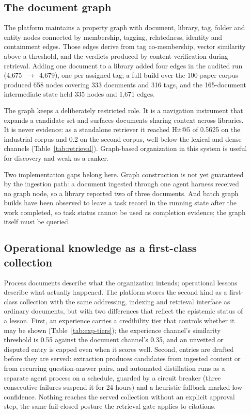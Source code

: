 \subsection{The document graph}
\label{sec:org-graph}

The platform maintains a property graph with document, library, tag, folder
and entity nodes connected by membership, tagging, relatedness, identity and
containment edges. Those edges derive from tag co-membership, vector
similarity above a threshold, and the verdicts produced by content
verification during retrieval. Adding one document to a library added four
edges in the audited run (4{,}675~$\rightarrow$~4{,}679), one per assigned
tag; a full build over the 100-paper corpus produced 658 nodes covering 333
documents and 316 tags, and the 165-document intermediate state held 335
nodes and 1{,}671 edges.

The graph keeps a deliberately restricted role. It is a navigation instrument
that expands a candidate set and surfaces documents sharing context across
libraries. It is never evidence: as a standalone retriever it reached Hit@5
of 0.5625 on the industrial corpus and 0.2 on the second corpus, well below
the lexical and dense channels (Table~\ref{tab:retrieval}). Graph-based
organization in this system is useful for discovery and weak as a ranker.

Two implementation gaps belong here. Graph construction is not yet guaranteed
by the ingestion path: a document ingested through one agent harness received
no graph node, so a library reported two of three documents. And batch graph
builds have been observed to leave a task record in the running state after
the work completed, so task status cannot be used as completion evidence; the
graph itself must be queried.

\subsection{Operational knowledge as a first-class collection}
\label{sec:org-experience}

Process documents describe what the organization intends; operational lessons
describe what actually happened. The platform stores the second kind as a
first-class collection with the same addressing, indexing and retrieval
interface as ordinary documents, but with two differences that reflect the
epistemic status of a lesson. First, an experience carries a credibility tier
that controls whether it may be shown (Table~\ref{tab:exp-tiers}); the
experience channel's similarity threshold is 0.55 against the document
channel's 0.35, and an unvetted or disputed entry is capped even when it
scores well. Second, entries are drafted before they are served: extraction
produces candidates from ingested content or from recurring question-answer
pairs, and automated distillation runs as a separate agent process on a
schedule, guarded by a circuit breaker (three consecutive failures suspend it
for 24 hours) and a heuristic fallback marked low-confidence. Nothing reaches
the served collection without an explicit approval step, the same fail-closed
posture the retrieval gate applies to citations.

